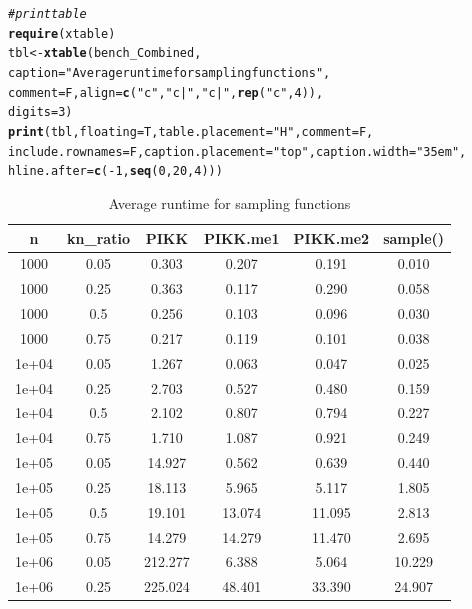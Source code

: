\documentclass{article}\usepackage[]{graphicx}\usepackage[]{color}
\makeatletter
\newcommand{\hlnum}[1]{\textcolor[rgb]{0.686,0.059,0.569}{#1}}%
\newcommand{\hlstr}[1]{\textcolor[rgb]{0.192,0.494,0.8}{#1}}%
\newcommand{\hlcom}[1]{\textcolor[rgb]{0.678,0.584,0.686}{\textit{#1}}}%
\newcommand{\hlopt}[1]{\textcolor[rgb]{0,0,0}{#1}}%
\newcommand{\hlstd}[1]{\textcolor[rgb]{0.345,0.345,0.345}{#1}}%
\newcommand{\hlkwb}[1]{\textcolor[rgb]{0.69,0.353,0.396}{#1}}%
\newcommand{\hlkwc}[1]{\textcolor[rgb]{0.333,0.667,0.333}{#1}}%
\newcommand{\hlkwd}[1]{\textcolor[rgb]{0.737,0.353,0.396}{\textbf{#1}}}%
\newenvironment{kframe}{%
 \def\at@end@of@kframe{}%
 \ifinner\ifhmode%
  \def\at@end@of@kframe{\end{minipage}}%
  \begin{minipage}{\columnwidth}%
 \fi\fi%
 \def\FrameCommand##1{\hskip\@totalleftmargin \hskip-\fboxsep
 \colorbox{shadecolor}{##1}\hskip-\fboxsep
     \hskip-\linewidth \hskip-\@totalleftmargin \hskip\columnwidth}%
 \MakeFramed {\advance\hsize-\width
   \@totalleftmargin\z@ \linewidth\hsize
   \@setminipage}}%
 {\par\unskip\endMakeFramed%
 \at@end@of@kframe}
\makeatother
\begin{document}
\begin{kframe}
\begin{alltt}
\hlcom{#print table}
\hlkwd{require}\hlstd{(xtable)}
\hlstd{tbl} \hlkwb{<-} \hlkwd{xtable}\hlstd{(bench_Combined,}
              \hlkwc{caption} \hlstd{=} \hlstr{"Average runtime for sampling functions"}\hlstd{,}
              \hlkwc{comment} \hlstd{= F,} \hlkwc{align} \hlstd{=} \hlkwd{c}\hlstd{(}\hlstr{"c"}\hlstd{,} \hlstr{"c|"}\hlstd{,}\hlstr{"c|"}\hlstd{,}\hlkwd{rep}\hlstd{(}\hlstr{"c"}\hlstd{,} \hlnum{4}\hlstd{)),}
              \hlkwc{digits} \hlstd{=} \hlnum{3}\hlstd{)}
\hlkwd{print}\hlstd{(tbl,} \hlkwc{floating} \hlstd{= T,} \hlkwc{table.placement} \hlstd{=} \hlstr{"H"}\hlstd{,} \hlkwc{comment} \hlstd{= F,}
      \hlkwc{include.rownames} \hlstd{= F,} \hlkwc{caption.placement} \hlstd{=} \hlstr{"top"}\hlstd{,} \hlkwc{caption.width} \hlstd{=} \hlstr{"35em"}\hlstd{,}
      \hlkwc{hline.after} \hlstd{=} \hlkwd{c}\hlstd{(}\hlopt{-}\hlnum{1}\hlstd{,} \hlkwd{seq}\hlstd{(}\hlnum{0}\hlstd{,} \hlnum{20}\hlstd{,} \hlnum{4}\hlstd{)))}
\end{alltt}
\end{kframe}\begin{table}[H]
\centering
\parbox{35em}{\caption{Average runtime for sampling functions}} 
\begin{tabular}{c|c|cccc}
  \hline
n & kn\_ratio & PIKK & PIKK.me1 & PIKK.me2 & sample() \\ 
  \hline
1000 & 0.05 & 0.303 & 0.207 & 0.191 & 0.010 \\ 
  1000 & 0.25 & 0.363 & 0.117 & 0.290 & 0.058 \\ 
  1000 & 0.5 & 0.256 & 0.103 & 0.096 & 0.030 \\ 
  1000 & 0.75 & 0.217 & 0.119 & 0.101 & 0.038 \\ 
   \hline
1e+04 & 0.05 & 1.267 & 0.063 & 0.047 & 0.025 \\ 
  1e+04 & 0.25 & 2.703 & 0.527 & 0.480 & 0.159 \\ 
  1e+04 & 0.5 & 2.102 & 0.807 & 0.794 & 0.227 \\ 
  1e+04 & 0.75 & 1.710 & 1.087 & 0.921 & 0.249 \\ 
   \hline
1e+05 & 0.05 & 14.927 & 0.562 & 0.639 & 0.440 \\ 
  1e+05 & 0.25 & 18.113 & 5.965 & 5.117 & 1.805 \\ 
  1e+05 & 0.5 & 19.101 & 13.074 & 11.095 & 2.813 \\ 
  1e+05 & 0.75 & 14.279 & 14.279 & 11.470 & 2.695 \\ 
   \hline
1e+06 & 0.05 & 212.277 & 6.388 & 5.064 & 10.229 \\ 
  1e+06 & 0.25 & 225.024 & 48.401 & 33.390 & 24.907 \\ 

\end{tabular}
\end{table}
\end{document}
